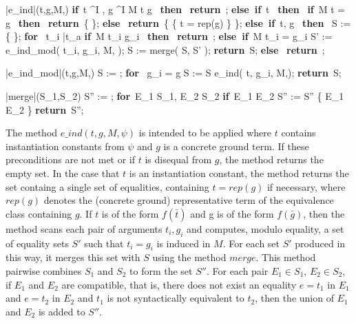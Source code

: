 \documentclass{llncs}
\def\IF{\qtab\keyword{if}\ }
\def\THEN{\ \keyword{then}\ }
\def\ELSE{\untab\qtab\keyword{else}\ }
\def\ELSEIF{\untab\qtab\keyword{else if}\ }
\def\FI{\untab}
\def\RETURN{\keyword{return}\ }
\def\ENDPROC{\untab}
\def\DOFOR{\qtab\keyword{for}\ }
\def\ENDFOR{\untab}
\def\keyword#1{\mbox{\normalshape\bf #1}}
\begin{document}
\begin{minipage}[t]{.4\linewidth}
\begin{program}
\PROC |e\_ind|(t,g,M,\psi) \BODY
  \IF t \not\mapsto^I \psi, g \not\mapsto^I \emptyset {} M \models t \neq g \THEN
    \RETURN \emptyset;
  \ELSEIF t  \THEN
    \IF M \models t = g \THEN
      \RETURN \{ \emptyset \};
    \ELSE
      \RETURN \{ \{ t = rep(g) \} \};
    \FI
  \ELSEIF t, g  \THEN
    S := \{ \emptyset \};
    \DOFOR {} t_i  \bar{t_a} 
      \IF M \models t_i \neq g_i \THEN
        \RETURN \emptyset;
      \ELSEIF M \not\models t_i = g_i
        S' := e\_ind\_mod( t_i, g_i, M, \psi );
        S := merge( S, S' );
      \FI
    \ENDFOR
    \RETURN S;
  \ELSE
    \RETURN \emptyset;
  \FI
\ENDPROC
\end{program}
\end{minipage}
\begin{minipage}[t]{.4\linewidth}
\begin{program}
\PROC |e\_ind\_mod|(t,g,M,\psi) \BODY
  S := \emptyset;
  \DOFOR {} g_i = g
    S := S \cup e\_ind( t, g_i, M,\psi );
  \ENDFOR
  \RETURN S;
\ENDPROC
\end{program}
\begin{program}
\PROC |merge|(S_1,S_2) \BODY
  S'' := \emptyset;
  \DOFOR E_1 \in S_1, E_2 \in S_2
    \IF E_1  E_2 
      S'' := S'' \cup \{ E_1 \cup E_2 \}
    \FI
  \ENDFOR
  \RETURN S'';
\ENDPROC
\end{program}
\end{minipage}

The method $e\_ind(t,g,M,\psi)$ is intended to be applied where $t$ contains instantiation constants from $\psi$ and $g$ is a concrete ground term.
If these preconditions are not met or if $t$ is disequal from $g$, the method returns the empty set.
In the case that $t$ is an instantiation constant, the method returns the set containg a single set of equalities, containing $t = rep( g )$ if necessary, where $rep( g )$ denotes the (concrete ground) representative term of the equivalence class containing $g$.
If $t$ is of the form $f(\bar{t})$ and g is of the form $f(\bar{g})$, then the method scans each pair of arguments $t_i, g_i$ and computes, modulo equality, a set of equality sets $S'$ such that $t_i = g_i$ is induced in $M$.
For each set $S'$ produced in this way, it merges this set with $S$ using the method $merge$.
This method pairwise combines $S_1$ and $S_2$ to form the set $S''$.
For each pair $E_1 \in S_1$, $E_2 \in S_2$, if $E_1$ and $E_2$ are compatible, that is, there does not exist an equality $e = t_1$ in $E_1$ and $e = t_2$ in $E_2$ and $t_1$ is not syntactically equivalent to $t_2$, then the union of $E_1$ and $E_2$ is added to $S''$.
\end{document}
